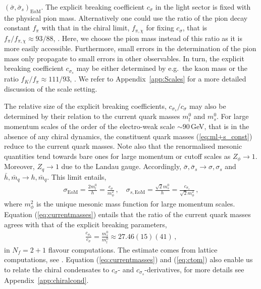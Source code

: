\documentclass[%
reprint,
superscriptaddress,
showpacs,preprintnumbers,
 amsmath,amssymb,
 aps,
prd,
]{revtex4-1}
\def\Eq#1{Equation (\ref{#1})}
\def\eq#1{(\ref{#1})}
\def\app#1{Appendix~\ref{#1}}
\begin{document}
$(\bar \sigma,\bar \sigma_s)_\textrm{EoM}$. The explicit breaking
coefficient $c_\sigma$ in the light sector is fixed with the physical
pion mass. Alternatively one could use the ratio of the pion decay
constant $f_{\pi}$ with that in the chiral limit, $f_{\pi,\chi}$ for
fixing $c_\sigma$, that is $f_{\pi}/f_{\pi,\chi}\approx 93/88$,
\cite{Tanabashi:2018oca}. Here, we choose the pion mass instead of
this ratio as it is more easily accessible. Furthermore, small errors
in the determination of the pion mass only propagate to small errors
in other observables. In turn, the explicit breaking coefficient
$c_{\sigma_s}$ may be either determined by e.g.\ the kaon mass or the
ratio $f_K/f_\pi \approx 111/93$, \cite{Tanabashi:2018oca}. We
  refer to \app{app:Scales} for a more detailed discussion of the
  scale setting.

  The relative size of the explicit breaking coefficients,
  $c_{\sigma_s}/c_\sigma$ may also be determined by their relation to
  the current quark masses $m_l^0$ and $m_s^0$. For large momentum
  scales of the order of the electro-weak scale $\sim 90$\,GeV, that
  is in the absence of any chiral dynamics, the constituent quark
  masses \eq{eq:ml+s_const} reduce to the current quark masses. Note
  also that the renormalised mesonic quantities tend towards bare ones
  for large momentum or cutoff scales as $Z_\phi\to 1$. Moreover,
  $Z_q\to 1$ due to the Landau gauge. Accordingly,
  $\bar \sigma, \bar\sigma_s \to \sigma, \sigma_s$ and
  $\bar h, \bar m_q\to h, \bar m_q$. This limit entails,
%
\begin{align}\label{eq:currentmasses} 
  \sigma_\textrm{EoM}=\frac{ 2 m_l^0}{h} =
  \frac{c_\sigma}{m^2_\phi}\,,\quad 
   \sigma_{s,\textrm{EoM}}=\frac{\sqrt{2   }m_s^0}{h} =
  \frac{c_{\sigma_s}}{\sqrt{2} m^2_\phi}
  \,, 
\end{align}
%
where $m_\phi^2$ is the unique mesonic mass function for large
momentum scales. \Eq{eq:currentmasses} entails that the ratio of the
current quark masses agrees with that of the explicit breaking
parameters,
%
\begin{align}\label{eq:ctom}
  \frac{c_{\sigma_s}}{c_\sigma}= \frac{m^0_s}{m_l^0} \approx
  27.46(15)(41) \,,  
\end{align}
%
in $N_f=2+1$ flavour computations. The estimate comes from lattice
computations, see \cite{Aoki:2013ldr}. \Eq{eq:currentmasses} and
\eq{eq:ctom} also enable us to relate the chiral condensates to
$c_\sigma$- and $c_{\sigma_s}$-derivatives, for more details see
\app{app:chiralcond}.
\end{document}
